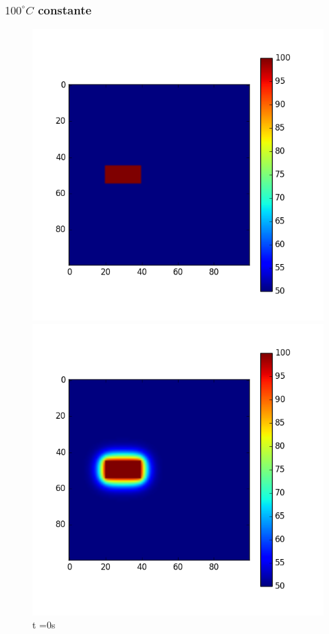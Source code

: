 \documentclass{article}
\begin{document}
\subsubsection{$100^\circ C$ constante}
\begin{figure}[H]
  \includegraphics[width=\linewidth]{periodicasCte0.png}
  \caption{t =0s}\label{fig:awesome_image1}
\endminipage\hfill
{}
  \includegraphics[width=\linewidth]{periodicasCte100.png}

\end{figure}
\end{document}
